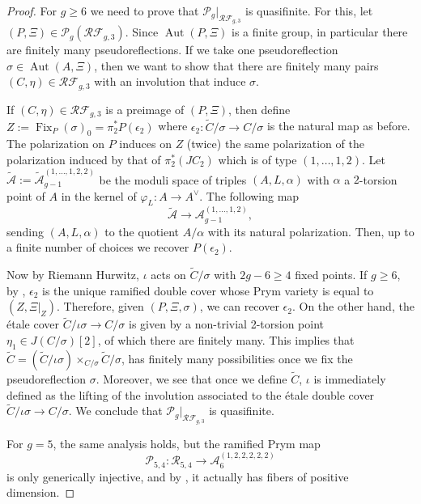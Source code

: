 \documentclass[preprint,12pt]{amsart}
\def\cA{\ensuremath{\mathcal{A}}}
\def\cF{\ensuremath{\mathcal{F}}}
\def\cP{\ensuremath{\mathcal{P}}}
\def\cR{\ensuremath{\mathcal{R}}}
\def\tC{\ensuremath{\tilde{C}}}
\DeclareMathOperator{\Aut}{Aut}
\DeclareMathOperator{\Fix}{Fix}
\theoremstyle{plain}
\theoremstyle{definition}
\begin{document}
\begin{proof}
For $g\geq 6$ we need to prove that $\cP_g|_{\cR\cF_{g,3}}$ is quasifinite.
For this, let $(P,\Xi)\in \cP_g(\cR\cF_{g,3})$.
Since $\Aut(P,\Xi)$ is a finite group, in particular there are finitely many pseudoreflections.
If we take one pseudoreflection $\sigma\in\Aut(A,\Xi)$, then we want to show that there are finitely many pairs $(C,\eta)\in\cR\cF_{g,3}$ with an involution that induce $\sigma$.

If $(C,\eta)\in\cR\cF_{g,3}$ is a preimage of $(P,\Xi)$, then define $Z:=\Fix_P(\sigma)_0=\pi_2^*P(\epsilon_2)$ where $\epsilon_2:\tC/\sigma\to C/\sigma$ is the natural map as before. The polarization on $P$ induces on $Z$ (twice) the same polarization of the polarization induced by 
that of $\pi_2^*(JC_2)$ which is of type $(1,\ldots,1,2)$. 
Let $\widetilde {\mathcal A}:=\widetilde {\mathcal {A}}_{g-1}^{(1,\ldots,1,2,2)}$ be the moduli space of triples $(A,L,\alpha)$ with $\alpha $ a $2$-torsion point of $A$ in the kernel of $\varphi_L:A\to A^{\vee }$. The following map
\[
\widetilde {\mathcal A}\longrightarrow 
\mathcal {A}_{g-1}^{(1,\ldots,1,2)}, 
\]
sending $(A,L,\alpha)$ to the quotient $A/\alpha $ with its natural polarization. Then, up to a finite number of choices we recover $P(\epsilon_2)$. 


Now by Riemann Hurwitz, $\iota$ acts on $\tC/\sigma$ with $2g-6\geq 4$ fixed points.
If $g\geq6$, by \cite[Theorem~1.1]{NO}, $\epsilon_2$ is the unique ramified double cover whose Prym variety is equal to $(Z,\Xi|_{Z})$.
Therefore, given $(P,\Xi,\sigma)$, we can recover $\epsilon_2$.
On the other hand, the \'etale cover $\tC/\iota\sigma\to C/\sigma$ is given by a non-trivial 2-torsion point $\eta_1\in J(C/\sigma)[2]$, of which there are finitely many.
This implies that $\tC=(\tC/\iota\sigma)\times_{C/\sigma}\tC/\sigma$, has finitely many possibilities once we fix the pseudoreflection $\sigma$.
Moreover, we see that once we define $\tC$, $\iota$ is immediately defined as the lifting of the involution associated to the \'etale double cover $\tC/\iota\sigma\to C/\sigma$.
We conclude that $\cP_g|_{\cR\cF_{g,3}}$ is quasifinite.

For $g=5$, the same analysis holds, but the ramified Prym map \[\cP_{5,4}:\cR_{5,4}\to\cA_{6}^{(1,2,2,2,2,2)}\]
is only generically injective, and by \cite{NO}, it actually has fibers of positive dimension.
\end{proof}
\end{document}
